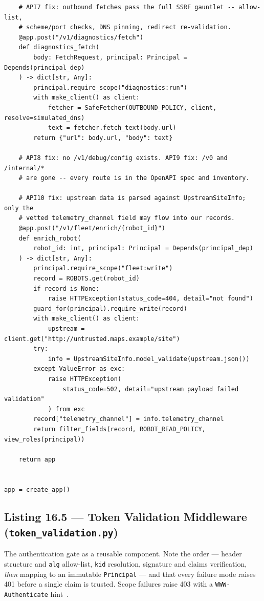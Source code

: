 \begin{verbatim}
    # API7 fix: outbound fetches pass the full SSRF gauntlet -- allow-list,
    # scheme/port checks, DNS pinning, redirect re-validation.
    @app.post("/v1/diagnostics/fetch")
    def diagnostics_fetch(
        body: FetchRequest, principal: Principal = Depends(principal_dep)
    ) -> dict[str, Any]:
        principal.require_scope("diagnostics:run")
        with make_client() as client:
            fetcher = SafeFetcher(OUTBOUND_POLICY, client, resolve=simulated_dns)
            text = fetcher.fetch_text(body.url)
        return {"url": body.url, "body": text}

    # API8 fix: no /v1/debug/config exists. API9 fix: /v0 and /internal/*
    # are gone -- every route is in the OpenAPI spec and inventory.

    # API10 fix: upstream data is parsed against UpstreamSiteInfo; only the
    # vetted telemetry_channel field may flow into our records.
    @app.post("/v1/fleet/enrich/{robot_id}")
    def enrich_robot(
        robot_id: int, principal: Principal = Depends(principal_dep)
    ) -> dict[str, Any]:
        principal.require_scope("fleet:write")
        record = ROBOTS.get(robot_id)
        if record is None:
            raise HTTPException(status_code=404, detail="not found")
        guard_for(principal).require_write(record)
        with make_client() as client:
            upstream = client.get("http://untrusted.maps.example/site")
        try:
            info = UpstreamSiteInfo.model_validate(upstream.json())
        except ValueError as exc:
            raise HTTPException(
                status_code=502, detail="upstream payload failed validation"
            ) from exc
        record["telemetry_channel"] = info.telemetry_channel
        return filter_fields(record, ROBOT_READ_POLICY, view_roles(principal))

    return app


app = create_app()
\end{verbatim}

\subsection{Listing 16.5 --- Token Validation Middleware (\texttt{token\_validation.py})}
\label{lst:ch16-tokenvalidation}

The authentication gate as a reusable component. Note the order --- header
structure and \texttt{alg} allow-list, \texttt{kid} resolution, signature
and claims verification, \emph{then} mapping to an immutable
\texttt{Principal} --- and that every failure mode raises 401 before a
single claim is trusted. Scope failures raise 403 with a
\texttt{WWW-Authenticate} hint~\cite{rfc9110}.

